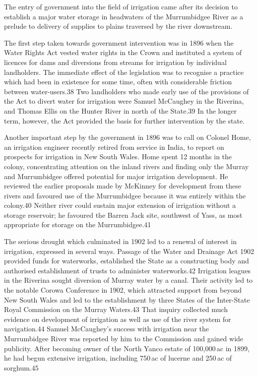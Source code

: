 The entry of government into the field of irrigation came after its
decision to establish a major water storage in headwaters of the
Murrumbidgee River as a prelude to delivery of supplies to plains
traversed by the river downstream.

The first step taken towards government intervention was in 1896 when
the Water Rights Act vested water rights in the Crown and instituted a
system of licences for dams and diversions from streams for irrigation
by individual landholders.  The immediate effect of the legislation
was to recognise a practice which had been in existence for some time,
often with considerable friction between water-users.38 Two
landholders who made early use of the provisions of the Act to divert
water for irrigation were Samuel McCaughey in the Riverina, and Thomas
Ellis on the Hunter River in north of the State.39 In the longer term,
however, the Act provided the basis for further intervention by the
state.

Another important step by the government in 1896 was to call on
Colonel Home, an irrigation engineer recently retired from service in
India, to report on prospects for irrigation in New South Wales.  Home
spent 12 months in the colony, concentrating attention on the inland
rivers and finding only the Murray and Murrumbidgee offered potential
for major irrigation development.  He reviewed the earlier proposals
made by McKinney for development from these rivers and favoured use of
the Murrumbidgee because it was entirely within the colony.40 Neither
river could sustain major extension of irrigation without a storage
reservoir; he favoured the Barren Jack site, southwest of Yass, as
most appropriate for storage on the Murrumbidgee.41

The serious drought which culminated in 1902 led to a renewal of
interest in irrigation, expressed in several ways. Passage of the
Water and Drainage Act 1902 provided funds for waterworks, established
the State as a constructing body and authorised establishment of
trusts to administer waterworks.42 Irrigation leagues in the Riverina
sought diversion of Murray water by a canal.  Their activity led to
the notable Corowa Conference in 1902, which attracted support from
beyond New South Wales and led to the establishment by three States of
the Inter-State Royal Commission on the Murray Waters.43 That inquiry
collected much evidence on development of irrigation as well as use of
the river system for navigation.44 Samuel McCaughey's success with
irrigation near the Murrumbidgee River was reported by him to the
Commission and gained wide publicity. After becoming owner of the
North Yanco estate of 100,000\,ac in 1899, he had begun extensive
irrigation, including 750\,ac of lucerne and 250\,ac of sorghum.45


